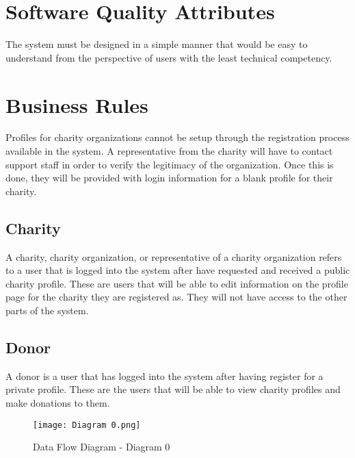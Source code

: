 \documentclass{scrreprt}
\begin{document}
\section{Software Quality Attributes}

The system must be designed in a simple manner that would be easy to understand from the perspective of users with the least technical competency.\\

\section{Business Rules}

Profiles for charity organizations cannot be setup through the registration process available in the system. A representative from the charity will have to contact support staff in order to verify the legitimacy of the organization. Once this is done, they will be provided with login information for a blank profile for their charity.\\


\subsection*{Charity}
A charity, charity organization, or representative of a charity organization refers to a user that is logged into the system after have requested and received a public charity profile. These are users that will be able to edit information on the profile page for the charity they are registered as. They will not have access to the other parts of the system.\\

\subsection*{Donor}
A donor is a user that has logged into the system after having register for a private profile. These are the users that will be able to view charity profiles and make donations to them.\\


\begin{figure}[!h]
    \centering
    \texttt{[image: Diagram 0.png]}
    {\caption*{Data Flow Diagram - Diagram 0}}
\end{figure}
\end{document}
